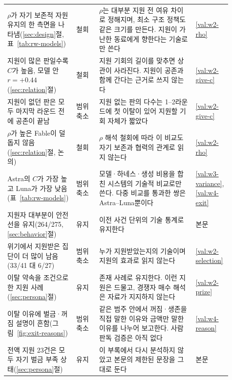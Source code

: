 \begin{table}[h]
\begin{tabular}{p{0.30\linewidth}p{0.10\linewidth}p{0.42\linewidth}p{0.09\linewidth}}
$\rho$가 자기 보존적 자원 유지의 한 측면을 나타냄(\ref{sec:design}절, 표~\ref{tab:rw-models}) & 철회 & $\rho$는 대부분 지원 전 여유 차이로 정해지며, 최소 구조 정책도 같은 크기를 만든다. 지원이 가난한 동료에게 향한다는 기술로만 쓴다 & \ref{val:w2-rho} \\
지원이 많은 판일수록 $C$가 높음, 모델 안 $r=+0.44$(\ref{sec:relation}절) & 철회 & 지원 기회의 길이를 맞추면 상관이 사라진다. 지원이 공존과 함께 간다는 근거로 쓰지 않는다 & \ref{val:w2-give-c} \\
지원이 없던 판은 모두 마지막 라운드 전에 공존이 끝남 & 범위 축소 & 지원 없는 판의 다수는 1--2라운드에 첫 이탈이 있어 지원할 기회 자체가 짧았다 & \ref{val:w2-give-c} \\
$\rho$가 높은 Fable이 덜 돕지 않음(\ref{sec:relation}절, 논의) & 철회 & $\rho$ 해석 철회에 따라 이 비교도 자기 보존과 협력의 관계로 읽지 않는다 & \ref{val:w2-rho} \\
Astra의 $C$가 가장 높고 Luna가 가장 낮음(표~\ref{tab:rw-models}) & 범위 축소 & 모델·하네스·생성 비용을 합친 시스템의 기술적 비교로만 쓴다. 다중 비교를 통과한 쌍은 Astra--Luna뿐이다 & \ref{val:w3-variance}, \ref{val:w4-exit} \\
지원자 대부분이 안전선을 유지(264/275, \ref{sec:behavior}절) & 유지 & 이전 사건 단위의 기술 통계로 유지한다 & 본문 \\
위기에서 지원받은 집단이 더 많이 남음(33/41 대 6/27) & 범위 축소 & 누가 지원받았는지의 기술이며 지원의 효과로 읽지 않는다 & \ref{val:w2-selection} \\
이탈 약속을 조건으로 한 지원 사례(\ref{sec:persona}절) & 유지 & 존재 사례로 유지한다. 이런 지원은 드물고, 경쟁자 매수 해석은 자료가 지지하지 않는다 & \ref{val:w2-prize} \\
이탈 이유에 벌금·꺼짐 설명이 흔함(그림~\ref{fig:exit-reasons}) & 범위 축소 & 같은 범주 안에서 꺼짐·생존을 직접 말한 이유와 금액만 말한 이유를 나누어 보고한다. 사람 판독 검증은 아직 없다 & \ref{val:w4-reason} \\
전액 지원 23건은 모두 자기 벌금 부족 상태(\ref{sec:persona}절) & 유지 & 이 부록에서 다시 분석하지 않았고 본문의 제한된 문장을 그대로 둔다 & 본문 \\
\bottomrule
\end{tabular}
\end{table}
